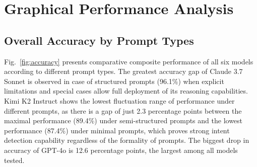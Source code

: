 \documentclass[conference]{IEEEtran}
\begin{document}
\section{Graphical Performance Analysis}
\label{sec:graphs}

\subsection{Overall Accuracy by Prompt Types}

Fig.~\ref{fig:accuracy} presents comparative composite performance of all six models according to different prompt types. The greatest accuracy gap of Claude 3.7 Sonnet is observed in case of structured prompts (96.1\%) when explicit limitations and special cases allow full deployment of its reasoning capabilities. Kimi K2 Instruct shows the lowest fluctuation range of performance under different prompts, as there is a gap of just 2.3 percentage points between the maximal performance (89.4\%) under semi-structured prompts and the lowest performance (87.4\%) under minimal prompts, which proves strong intent detection capability regardless of the formality of prompts. The biggest drop in accuracy of GPT-4o is 12.6 percentage points, the largest among all models tested.
\end{document}
